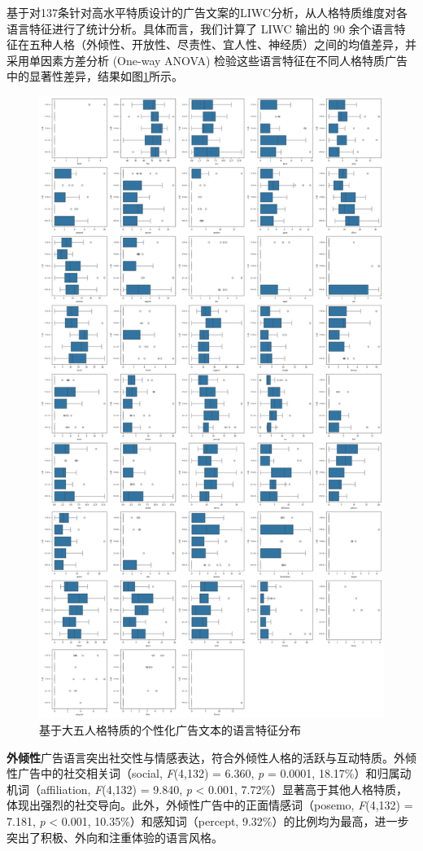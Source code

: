 基于对137条针对高水平特质设计的广告文案的LIWC分析，从人格特质维度对各语言特征进行了统计分析。具体而言，我们计算了 LIWC 输出的 90 余个语言特征在五种人格（外倾性、开放性、尽责性、宜人性、神经质）之间的均值差异，并采用单因素方差分析 (One-way ANOVA) 检验这些语言特征在不同人格特质广告中的显著性差异，结果如图\ref{fig:Study3-LIWC}所示。

\begin{figure}[htbp]
    \centering
    \includegraphics[width=0.8\linewidth]{Image/Study3-LIWC.png}
    \caption{\label{fig:Study3-LIWC}基于大五人格特质的个性化广告文本的语言特征分布}
\end{figure}

\textbf{外倾性}广告语言突出社交性与情感表达，符合外倾性人格的活跃与互动特质。外倾性广告中的社交相关词（social, \textit{F}(4,132) = 6.360, \textit{p} = 0.0001, 18.17\%）和归属动机词（affiliation, \textit{F}(4,132) = 9.840, \textit{p} < 0.001, 7.72\%）显著高于其他人格特质，体现出强烈的社交导向。此外，外倾性广告中的正面情感词（posemo, \textit{F}(4,132) = 7.181, \textit{p} < 0.001, 10.35\%）和感知词（percept, 9.32\%）的比例均为最高，进一步突出了积极、外向和注重体验的语言风格。

